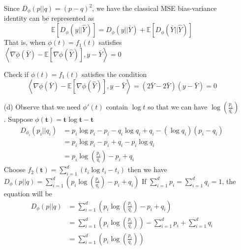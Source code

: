 \documentclass[12pt,a4paper]{article}
\begin{document}
\begin{enumerate}
        Since $D_{\phi}(p||q) = (p-q)^{2}$, we have the classical MSE bias-variance identity can be represented as
        \begin{equation*}
            \mathbb{E}[D_{\phi}(y||\hat{Y})] = D_{\phi}(y||\bar{Y}) + \mathbb{E}[D_{\phi}(\bar{Y}||\hat{Y})]
        \end{equation*}
        That is, when $\phi(t)=f_{1}(t)$ satisfies $\left\langle \nabla\phi(\bar{Y}) - \mathbb{E}[\nabla\phi(\hat{Y})], y-\bar{Y} \right\rangle = 0$
        
        Check if $\phi(t)=f_{1}(t)$ satisfies the condition
        \begin{equation*}
            \left\langle \nabla\phi(\bar{Y}) - \mathbb{E}[\nabla\phi(\hat{Y})], y-\bar{Y} \right\rangle = (2\bar{Y}-2\bar{Y})(y-\bar{Y}) = 0
        \end{equation*}
    \item[(d)]  
        Observe that we need $\phi'(t)$ contain $\log t$ so that we can have $\log (\frac{p_{i}}{q_{i}})$. Suppose $\phi(\mathbf{t}) = \mathbf{t}\log \mathbf{t} - \mathbf{t}$
        \begin{equation*}
            \begin{split}
                D_{\phi_{i}}(p_{i}||q_{i}) 
                    &= p_{i}\log p_{i} - p_{i} - q_{i}\log q_{i} + q_{i} - (\log q_{i})(p_{i}-q_{i})\\
                    &= p_{i}\log p_{i} - p_{i} + q_{i} - p_{i} \log q_{i} \\
                    &= p_{i}\log(\frac{p_{i}}{q_{i}}) - p_{i} + q_{i}
            \end{split}
        \end{equation*}
        Choose $f_{2}(\mathbf{t})= \sum_{i=1}^{d}(t_{i}\log t_{i} - t_{i})$ then we have $D_{\phi}(p||q) = \sum_{i=1}^{d}(p_{i}\log(\frac{p_{i}}{q_{i}}) - p_{i} + q_{i})$
        If $\sum_{i=1}^{d}p_{i} = \sum_{i=1}^{d} q_{i} = 1$, the equation will be
        \begin{equation*}
            \begin{split}
                D_{\phi}(p||q) 
                    &= \sum_{i=1}^{d}(p_{i}\log(\frac{p_{i}}{q_{i}}) - p_{i} + q_{i})\\
                    &= \sum_{i=1}^{d}(p_{i}\log(\frac{p_{i}}{q_{i}})) - \sum_{i=1}^{d}p_{i} + \sum_{i=1}^{d}q_{i}\\
                    &= \sum_{i=1}^{d}(p_{i}\log(\frac{p_{i}}{q_{i}}))
            \end{split}
        \end{equation*}
\end{enumerate}
\end{document}
